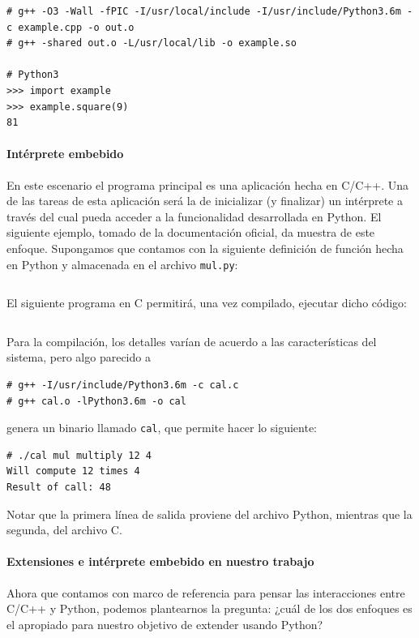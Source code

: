 \documentclass[]{article}
\begin{document}
\begin{verbatim}
# g++ -O3 -Wall -fPIC -I/usr/local/include -I/usr/include/Python3.6m -c example.cpp -o out.o
# g++ -shared out.o -L/usr/local/lib -o example.so

# Python3
>>> import example
>>> example.square(9)
81
\end{verbatim}

\paragraph{Intérprete embebido}

En este escenario el programa principal es una aplicación hecha en C/C++. Una
de las tareas de esta aplicación será la de inicializar (y finalizar) un
intérprete a través del cual pueda acceder a la funcionalidad desarrollada en
Python. El siguiente ejemplo, tomado de la documentación oficial, da muestra de
este enfoque. Supongamos que contamos con la siguiente definición de función
hecha en Python y almacenada en el archivo \verb!mul.py!:

\inputminted{Python}{codelistings/multiply.py}

El siguiente programa en C permitirá, una vez compilado, ejecutar dicho código:

\inputminted{c}{codelistings/use_multiply.c}

Para la compilación, los detalles varían de acuerdo a las características del
sistema, pero algo parecido a

\begin{verbatim}
# g++ -I/usr/include/Python3.6m -c cal.c
# g++ cal.o -lPython3.6m -o cal
\end{verbatim}

genera un binario llamado \verb!cal!, que permite hacer lo siguiente:

\begin{verbatim}
# ./cal mul multiply 12 4
Will compute 12 times 4
Result of call: 48
\end{verbatim}

Notar que la primera línea de salida proviene del archivo Python, mientras que
la segunda, del archivo C.

\paragraph{Extensiones e intérprete embebido en nuestro trabajo}

Ahora que contamos con marco de referencia para pensar las interacciones entre
C/C++ y Python, podemos plantearnos la pregunta: ¿cuál de los dos enfoques es
el apropiado para nuestro objetivo de extender \omnetpp{} usando Python?
\end{document}
